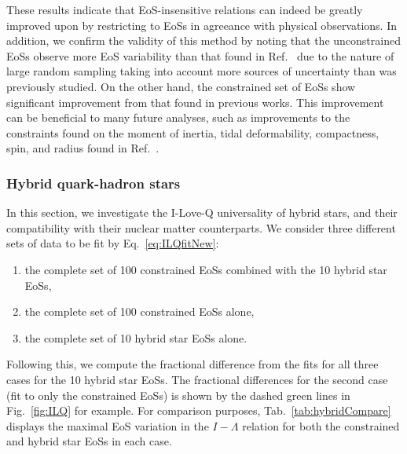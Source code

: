 \documentclass[prd,twocolumn,nofootinbib,superscriptaddress,amsmath,amssymb]{revtex4-1}
\begin{document}
These results indicate that EoS-insensitive relations can indeed be greatly improved upon by restricting to EoSs in agreeance with physical observations.
In addition, we confirm the validity of this method by noting that the unconstrained EoSs observe more EoS variability than that found in Ref.~\cite{Yagi:ILQ} due to the nature of large random sampling taking into account more sources of uncertainty than was previously studied.
On the other hand, the constrained set of EoSs show significant improvement from that found in previous works.
This improvement can be beneficial to many future analyses, such as improvements to the constraints found on the moment of inertia, tidal deformability, compactness, spin, and radius found in Ref.~\cite{Kumar:2019xgp}.

\subsubsection{Hybrid quark-hadron stars}
\label{sec:ilq-hyb}

In this section, we investigate the I-Love-Q universality of hybrid stars, and their compatibility with their nuclear matter counterparts.
We consider three different sets of data to be fit by Eq.~\ref{eq:ILQfitNew}:
\begin{enumerate}
\item the complete set of 100 constrained EoSs combined with the 10 hybrid star EoSs,
\item the complete set of 100 constrained EoSs alone,
\item the complete set of 10 hybrid star EoSs alone.
\end{enumerate}
Following this, we compute the fractional difference from the fits for all three cases for the 10 hybrid star EoSs.
The fractional differences for the second case (fit to only the constrained EoSs) is shown by the dashed green lines in Fig.~\ref{fig:ILQ} for example.
For comparison purposes, Tab.~\ref{tab:hybridCompare} displays the maximal EoS variation in the $I-\Lambda$ relation for both the constrained and hybrid star EoSs in each case.
\end{document}

